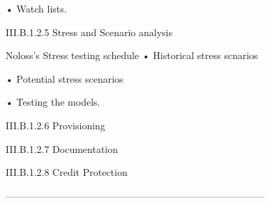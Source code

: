 •
Watch lists.


III.B.1.2.5 Stress and Scenario analysis

Noloss's Stress testing schedule
•
   Historical stress scnarios

•
   Potential stress scenarios

•
   Testing the models.


 

III.B.1.2.6 Provisioning 

 

III.B.1.2.7 Documentation

III.B.1.2.8 Credit Protection



--------------------------------------------------------------------------------
 



